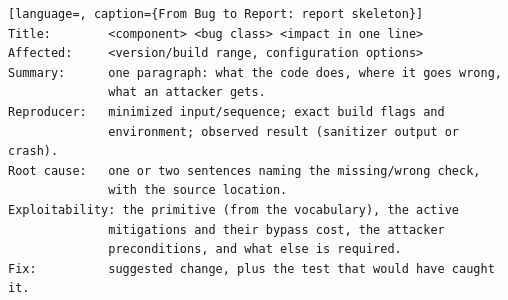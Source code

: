 \documentclass[12pt]{Training}
\begin{document}
\begin{sectionbox}
\begin{lstlisting}[language=, caption={From Bug to Report: report skeleton}]
Title:        <component> <bug class> <impact in one line>
Affected:     <version/build range, configuration options>
Summary:      one paragraph: what the code does, where it goes wrong,
              what an attacker gets.
Reproducer:   minimized input/sequence; exact build flags and
              environment; observed result (sanitizer output or crash).
Root cause:   one or two sentences naming the missing/wrong check,
              with the source location.
Exploitability: the primitive (from the vocabulary), the active
              mitigations and their bypass cost, the attacker
              preconditions, and what else is required.
Fix:          suggested change, plus the test that would have caught it.
\end{lstlisting}
\end{sectionbox}
\end{document}
